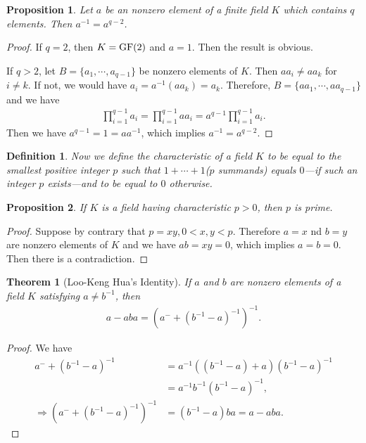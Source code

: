 \documentclass[11pt]{book}
\newtheorem{definition}{Definition}[chapter]
\newtheorem{theorem}{Theorem}[chapter]
\newtheorem{proposition}{Proposition}[chapter]
\theoremstyle{definition}
\numberwithin{equation}{chapter}
\begin{document}
\begin{proposition}
Let $a$ be an nonzero element of a finite field $K$ which contains $q$ elements. Then $a^{-1} = a^{q-2}$.
\end{proposition}
\begin{proof}
If $q = 2$, then $K = {\rm GF}(2)$ and $a = 1$. Then the result is obvious. 

If $q > 2$, let $B = \{a_1, \cdots, a_{q-1}\}$ be nonzero elements of $K$. Then $aa_i\neq aa_k$ for $i\neq k$. If not, we would have $a_i = a^{-1}(aa_k) = a_k$. Therefore, $B = \{a a_1, \cdots, a a_{q-1}\}$ and we have 
\begin{align*}
    \prod^{q-1}_{i=1}a_i = \prod^{q-1}_{i=1}aa_i = a^{q-1}\prod^{q-1}_{i=1}a_i.
\end{align*}
Then we have $a^{q-1} = 1 = a a^{-1}$, which implies $a^{-1} = a^{q-2}$.
\end{proof}

\medskip
\begin{definition}
Now we define the characteristic of a field $K$ to be equal to the smallest positive integer $p$ such that $1+\cdots+1$($p$ summands) equals $0$—if such an integer $p$ exists—and to be equal to $0$ otherwise.
\end{definition}

\medskip

\begin{proposition}
If $K$ is a field having characteristic $p > 0$, then $p$ is prime.
\end{proposition}
\begin{proof}
Suppose by contrary that $p = xy, 0<x,y<p$. Therefore $a = x$ nd $b = y$ are nonzero elements of $K$ and we have $ab = xy = 0$, which implies $a=b=0$. Then there is a contradiction. 
\end{proof}

\medskip

\begin{theorem}[Loo-Keng Hua's Identity]
If $a$ and $b$ are nonzero elements of a field $K$ satisfying $a\neq b^{-1}$, then
\begin{align*}
    a - aba = \left(a^{-} + (b^{-1} - a)^{-1}\right)^{-1}.
\end{align*}
\end{theorem}
\begin{proof}
We have
\begin{align*}
    a^{-} + (b^{-1} - a)^{-1} & = a^{-1}\left((b^{-1} - a) + a \right)(b^{-1} - a)^{-1}\\
    & = a^{-1}b^{-1}(b^{-1} - a)^{-1}, \\
    \Rightarrow \left(a^{-} + (b^{-1} - a)^{-1}\right)^{-1} & = (b^{-1} - a)ba = a - aba.
\end{align*}
\end{proof}
\end{document}
